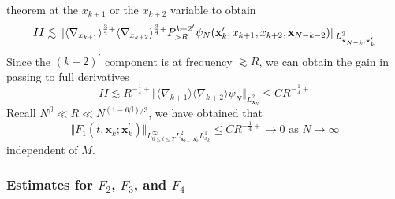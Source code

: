 \documentclass[12pt,letterpaper,leqno]{amsart}
\theoremstyle{plain}
\numberwithin{equation}{section}
\numberwithin{theorem}{section}
\numberwithin{proposition}{section}
\numberwithin{lemma}{section}
\numberwithin{corollary}{section}
\begin{document}
theorem at the $x_{k+1}$ or the $x_{k+2}$ variable to obtain 
\begin{equation*}
II\lesssim \Vert \langle \nabla _{x_{k+1}}\rangle ^{\frac{3}{4}+}\langle
\nabla _{x_{k+2}}\rangle ^{\frac{3}{4}+}P_{>R}^{k+2^{\prime }}\psi _{N}(%
\mathbf{x}_{k}^{\prime },x_{k+1},x_{k+2},\mathbf{x}_{N-k-2})\Vert _{L_{%
\mathbf{x}_{N-k},\mathbf{x}_{k}^{\prime }}^{2}}
\end{equation*}%
Since the $(k+2)^{\prime }$ component is at frequency $\gtrsim R$, we can
obtain the gain in passing to full derivatives 
\begin{equation*}
II\lesssim R^{-\frac{1}{4}+}\Vert \langle \nabla _{k+1}\rangle \langle
\nabla _{k+2}\rangle \psi _{N}\Vert _{L_{\mathbf{x}_{N}}^{2}}\leqslant CR^{-%
\frac{1}{4}+}
\end{equation*}%
Recall $N^{\beta }\ll R\ll N^{(1-6\beta )/3}$, we have obtained that%
\begin{equation*}
\Vert F_{1}(t,\mathbf{x}_{k};\mathbf{x}_{k}^{\prime })\Vert _{L_{0\leq t\leq
T}^{\infty }L_{\mathbf{x}_{k-1}\mathbf{x}_{k}^{\prime
}}^{2}L_{x_{k}}^{1}}\leqslant CR^{-\frac{1}{4}+}\rightarrow 0\text{ as }%
N\rightarrow \infty
\end{equation*}%
independent of $M$.

\subsubsection{Estimates for $F_{2}$, $F_{3}$, and $F_{4}$}
\end{document}
